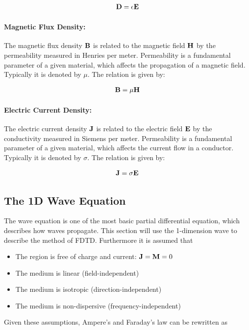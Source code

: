 \begin{align}
  \bold{D} = \epsilon \bold{E}
\end{align}

\paragraph{Magnetic Flux Density:} The magnetic flux density $\bold{B}$ is related to the magnetic field $\bold{H}$ by the permeability measured in Henries per meter. Permeability is a fundamental parameter of a given material, which affects the propagation of a magnetic field. Typically it is denoted by $\mu$. The relation is given by: 

\begin{align}
  \bold{B} = \mu \bold{H}
\end{align}
\paragraph{Electric Current Density:}  The electric current density $\bold{J}$ is related to the electric field $\bold{E}$ by the conductivity measured in Siemens per meter. Permeability is a fundamental parameter of a given material, which affects the current flow in a conductor. Typically it is denoted by $\sigma$. The relation is given by: 

\begin{align}
  \bold{J} = \sigma \bold{E}
\end{align}


\subsection{The 1D Wave Equation}
The wave equation is one of the most basic partial differential equation, which describes how waves propagate. This section will use the 1-dimension wave to describe the method of FDTD. Furthermore it is assumed that

\begin{itemize}
\item The region is free of charge and current: $\bold{J} = \bold{M} = 0$
\item The medium is linear (field-independent)
\item The medium is isotropic (direction-independent)
\item The medium is non-dispersive (frequency-independent)
\end{itemize}
Given these assumptions, Ampere's and Faraday's law can be rewritten as

